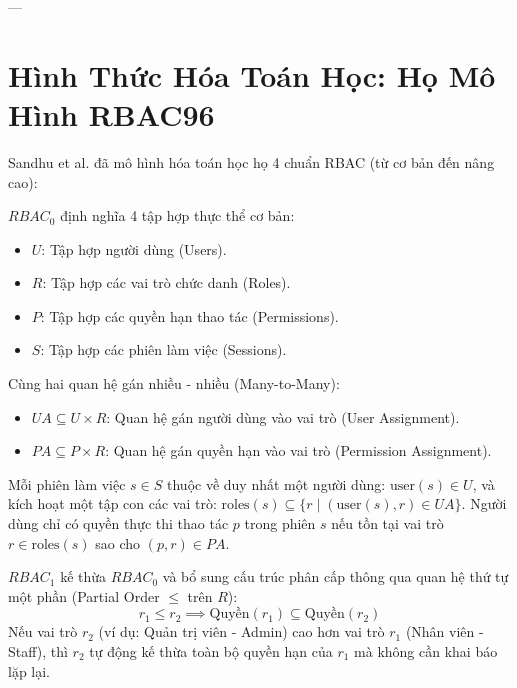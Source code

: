 \documentclass[11pt,a4paper]{article}
\begin{document}
---

\section{Hình Thức Hóa Toán Học: Họ Mô Hình RBAC96}

Sandhu et al. đã mô hình hóa toán học họ 4 chuẩn RBAC (từ cơ bản đến nâng cao):

\begin{formulationbox}
$RBAC_0$ định nghĩa 4 tập hợp thực thể cơ bản:
\begin{itemize}[leftmargin=1.5em]
    \item $U$: Tập hợp người dùng (Users).
    \item $R$: Tập hợp các vai trò chức danh (Roles).
    \item $P$: Tập hợp các quyền hạn thao tác (Permissions).
    \item $S$: Tập hợp các phiên làm việc (Sessions).
\end{itemize}
Cùng hai quan hệ gán nhiều - nhiều (Many-to-Many):
\begin{itemize}[leftmargin=1.5em]
    \item $UA \subseteq U \times R$: Quan hệ gán người dùng vào vai trò (User Assignment).
    \item $PA \subseteq P \times R$: Quan hệ gán quyền hạn vào vai trò (Permission Assignment).
\end{itemize}
Mỗi phiên làm việc $s \in S$ thuộc về duy nhất một người dùng: $\text{user}(s) \in U$, và kích hoạt một tập con các vai trò: $\text{roles}(s) \subseteq \{r \mid (\text{user}(s), r) \in UA\}$. Người dùng chỉ có quyền thực thi thao tác $p$ trong phiên $s$ nếu tồn tại vai trò $r \in \text{roles}(s)$ sao cho $(p, r) \in PA$.
\end{formulationbox}

\begin{formulationbox}
$RBAC_1$ kế thừa $RBAC_0$ và bổ sung cấu trúc phân cấp thông qua quan hệ thứ tự một phần (Partial Order $\le$ trên $R$):
\begin{equation}
    r_1 \le r_2 \implies \text{Quyền}(r_1) \subseteq \text{Quyền}(r_2)
\end{equation}
Nếu vai trò $r_2$ (ví dụ: Quản trị viên - Admin) cao hơn vai trò $r_1$ (Nhân viên - Staff), thì $r_2$ tự động kế thừa toàn bộ quyền hạn của $r_1$ mà không cần khai báo lặp lại.
\end{formulationbox}
\end{document}
